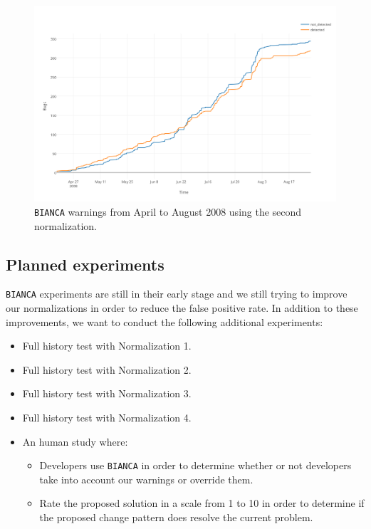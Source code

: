 \begin{figure}[h!]
  \centering
    \includegraphics[scale=0.55]{media/bianca-20.png}
    \caption{{\tt BIANCA} warnings from April to August 2008 using the second normalization. 
    \label{fig:bianca-exp-2}}
\end{figure}

\subsection{Planned experiments}

{\tt BIANCA} experiments are still in their early stage and we still trying to improve our normalizations in order to reduce the false positive rate. In addition to these improvements, we want to conduct the following additional experiments:

\begin{itemize}
	\item Full history test with Normalization 1.
	\item Full history test with Normalization 2.
	\item Full history test with Normalization 3.
	\item Full history test with Normalization 4.
	\item An human study where:
	\begin{itemize}
		\item  Developers use {\tt BIANCA} in order to determine whether or not developers take into account our warnings or override them.
		\item Rate the proposed solution in a scale from 1 to 10 in order to determine if the proposed change pattern does resolve the current problem.
	\end{itemize}
\end{itemize}